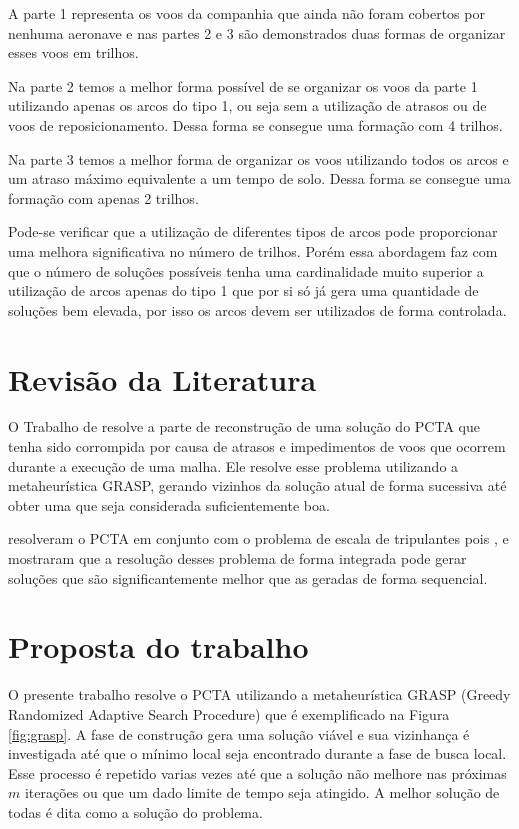 \documentclass[12pt]{article}
\begin{document}
A parte 1 representa os voos da companhia que ainda não foram cobertos por nenhuma aeronave e nas partes 2 e 3 são demonstrados duas formas de organizar esses voos em trilhos. 

Na parte 2 temos a melhor forma possível de se organizar os voos da parte 1 utilizando apenas os arcos do tipo 1, ou seja sem a utilização de atrasos ou de voos de reposicionamento. Dessa forma se consegue uma formação com 4 trilhos.

Na parte 3 temos a melhor forma de organizar os voos utilizando todos os arcos e um atraso máximo equivalente a um tempo de solo. Dessa forma se consegue uma formação com apenas 2 trilhos.

Pode-se verificar que a utilização de diferentes tipos de arcos pode proporcionar uma melhora significativa  no número de trilhos. Porém essa abordagem faz com que o número de soluções possíveis tenha uma cardinalidade muito superior a utilização de arcos apenas do tipo 1 que por si só já gera uma quantidade de soluções bem elevada, por isso os arcos devem ser utilizados de forma controlada. 


\section{Revisão da Literatura} 


O Trabalho de \cite{arguelo1007} resolve a 
parte de reconstrução de uma solução do PCTA que tenha sido corrompida 
por causa de atrasos e impedimentos de voos que ocorrem durante a 
execução de uma malha. Ele resolve esse problema utilizando a 
metaheurística GRASP, gerando vizinhos da solução atual de forma 
sucessiva até obter uma que seja considerada suficientemente boa.
		
\cite{mercier2007} resolveram o PCTA em 
conjunto com o problema de escala de tripulantes pois 
\cite{cordeau2001}, \cite{klabjan2002} e
\cite{mainville2003} mostraram que a resolução desses problema de 
forma integrada pode gerar soluções que são significantemente melhor 
que as geradas de forma sequencial. 


\section{Proposta do trabalho}

O presente trabalho resolve o PCTA utilizando a metaheurística GRASP (Greedy Randomized Adaptive Search Procedure) \cite{graspresende} que é exemplificado na Figura \ref{fig:grasp}. A fase de construção gera uma solução viável e sua vizinhança é investigada até que o mínimo local seja encontrado durante a fase de busca local. Esse processo é repetido varias vezes até que a solução não melhore nas próximas $m$ iterações ou que um dado limite de tempo seja atingido. A melhor solução de todas é dita como a solução do problema.
\end{document}
